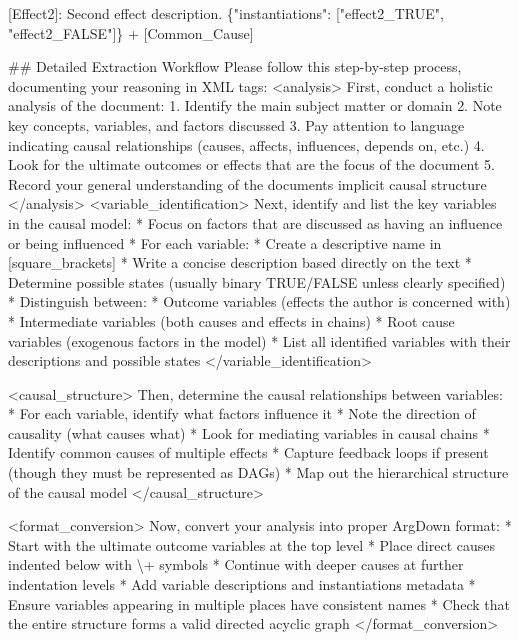 \documentclass[
  11pt,
  letterpaper,
]{book}
\newenvironment{Shaded}{\begin{snugshade}}{\end{snugshade}}
\newcommand{\ErrorTok}[1]{\textcolor[rgb]{0.68,0.00,0.00}{#1}}
\newcommand{\StringTok}[1]{\textcolor[rgb]{0.13,0.47,0.30}{#1}}
\begin{document}
\begin{landscape}
\begin{Shaded}
\begin{Highlighting}[]
\StringTok{[Effect2]: Second effect description. \{"instantiations": ["effect2\_TRUE", "effect2\_FALSE"]\}}
\StringTok{  + [Common\_Cause]}

\StringTok{\#\# Detailed Extraction Workflow}
\StringTok{Please follow this step{-}by{-}step process, documenting your reasoning in XML tags:}
\StringTok{\textless{}analysis\textgreater{}}
\StringTok{First, conduct a holistic analysis of the document:}
\StringTok{1. Identify the main subject matter or domain}
\StringTok{2. Note key concepts, variables, and factors discussed}
\StringTok{3. Pay attention to language indicating causal relationships (causes, affects, influences, depends on, etc.)}
\StringTok{4. Look for the ultimate outcomes or effects that are the focus of the document}
\StringTok{5. Record your general understanding of the document\textquotesingle{}s implicit causal structure}
\StringTok{\textless{}/analysis\textgreater{}}
\StringTok{\textless{}variable\_identification\textgreater{}}
\StringTok{Next, identify and list the key variables in the causal model:}
\StringTok{* Focus on factors that are discussed as having an influence or being influenced}
\StringTok{* For each variable:}
\StringTok{  * Create a descriptive name in [square\_brackets]}
\StringTok{  * Write a concise description based directly on the text}
\StringTok{  * Determine possible states (usually binary TRUE/FALSE unless clearly specified)}
\StringTok{* Distinguish between:}
\StringTok{  * Outcome variables (effects the author is concerned with)}
\StringTok{  * Intermediate variables (both causes and effects in chains)}
\StringTok{  * Root cause variables (exogenous factors in the model)}
\StringTok{* List all identified variables with their descriptions and possible states}
\StringTok{\textless{}/variable\_identification\textgreater{}}

\StringTok{\textless{}causal\_structure\textgreater{}}
\StringTok{Then, determine the causal relationships between variables:}
\StringTok{* For each variable, identify what factors influence it}
\StringTok{* Note the direction of causality (what causes what)}
\StringTok{* Look for mediating variables in causal chains}
\StringTok{* Identify common causes of multiple effects}
\StringTok{* Capture feedback loops if present (though they must be represented as DAGs)}
\StringTok{* Map out the hierarchical structure of the causal model}
\StringTok{\textless{}/causal\_structure\textgreater{}}

\StringTok{\textless{}format\_conversion\textgreater{}}
\StringTok{Now, convert your analysis into proper ArgDown format:}
\StringTok{* Start with the ultimate outcome variables at the top level}
\StringTok{* Place direct causes indented below with }\ErrorTok{\textbackslash{}}\StringTok{+ symbols}
\StringTok{* Continue with deeper causes at further indentation levels}
\StringTok{* Add variable descriptions and instantiations metadata}
\StringTok{* Ensure variables appearing in multiple places have consistent names}
\StringTok{* Check that the entire structure forms a valid directed acyclic graph}
\StringTok{\textless{}/format\_conversion\textgreater{}}


\end{Highlighting}
\end{Shaded}
\end{landscape}
\end{document}
